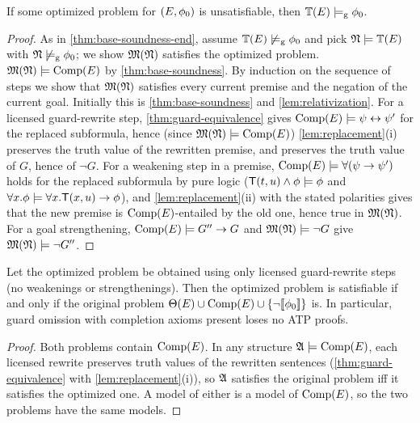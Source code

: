 \begin{theorem}
  \label{thm:guards-sound}
  If some optimized problem for $(\Env, \phi_0)$ is unsatisfiable, then
  $\Th \entg \phi_0$.
\end{theorem}

\begin{proof}
  As in \cref{thm:base-soundness-end}, assume $\Th \not\entg \phi_0$ and
  pick $\NN \models \Th$ with $\NN \not\entg \phi_0$; we show
  $\MN$ satisfies the optimized problem.  $\MN \models \Comp$ by
  \cref{thm:base-soundness}.  By induction on the sequence of steps we
  show that $\MN$ satisfies every current premise and the negation of the
  current goal.  Initially this is \cref{thm:base-soundness} and
  \cref{lem:relativization}.  For a licensed guard-rewrite step,
  \cref{thm:guard-equivalence} gives
  $\Comp \models \psi \biimp \psi'$ for the replaced subformula, hence
  (since $\MN \models \Comp$) \cref{lem:replacement}(i) preserves the
  truth value of the rewritten premise, and preserves the truth value of
  $G$, hence of $\neg G$.  For a weakening step in a premise,
  $\Comp \models \forall(\psi \imp \psi')$ holds for the replaced
  subformula by pure logic ($\T(t,u) \wedge \phi \models \phi$ and
  $\forall x.\phi \models \forall x. \T(x,u) \imp \phi$), and
  \cref{lem:replacement}(ii) with the stated polarities gives that the
  new premise is $\Comp$-entailed by the old one, hence true in $\MN$.
  For a goal strengthening, $\Comp \models G'' \imp G$ and
  $\MN \models \neg G$ give $\MN \models \neg G''$.
\end{proof}

\begin{corollary}[Conservativity]
  \label{cor:no-loss}
  Let the optimized problem be obtained using only licensed guard-rewrite
  steps (no weakenings or strengthenings).  Then the optimized problem is
  satisfiable if and only if the original problem
  $\Ax \cup \Comp \cup \{\neg\enc{\phi_0}\}$ is.  In particular, guard
  omission with completion axioms present loses no ATP proofs.
\end{corollary}

\begin{proof}
  Both problems contain $\Comp$.  In any structure
  $\AA \models \Comp$, each licensed rewrite preserves truth values of
  the rewritten sentences (\cref{thm:guard-equivalence} with
  \cref{lem:replacement}(i)), so $\AA$ satisfies the original problem iff
  it satisfies the optimized one.  A model of either is a model of
  $\Comp$, so the two problems have the same models.
\end{proof}

